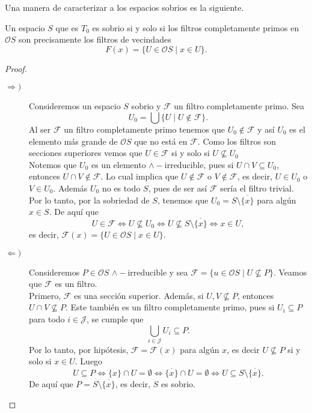 Una manera de caracterizar a los espacios sobrios es la siguiente.

\begin{thm}\label{Fprimo}
Un espacio $S$ que es $T_0$ es sobrio si y solo si los filtros completamente primos en $\mathcal{O}S$ son precisamente los filtros de vecindades
\[
F(x)=\{U\in \mathcal{O}S\mid x\in U\}.
\]
\end{thm}

\begin{proof}
\begin{description}
    \item[$\Rightarrow )$] Consideremos un espacio $S$ sobrio y $\mathcal{F}$ un filtro completamente primo. Sea 
    \[
    U_0=\bigcup\{U\mid U\notin \mathcal{F}\}.
    \]
    Al ser $\mathcal{F}$ un filtro completamente primo tenemos que $U_0\notin \mathcal{F}$ y así $U_0$ es el elemento más grande de $\mathcal{O}S$ que no está en $\mathcal{F}$. Como los filtros son secciones superiores vemos que $U\in \mathcal{F}$ si y solo si $U\nsubseteq U_0$\\

    \noindent
    Notemos que $U_0$ es un elemento $\wedge-$irreducible, pues si $U\cap V\subseteq U_0$, entonces $U\cap V\notin \mathcal{F}$. Lo cual implica que $U\notin\mathcal{F}$ o $V\notin\mathcal{F}$, es decir, $U\in U_0$ o $V\in U_0$. Además $U_0$ no es todo $S$, pues de ser así $\mathcal{F}$ sería el filtro trivial.\\

    \noindent
    Por lo tanto, por la sobriedad de $S$, tenemos que $U_0=S\setminus \overline{\{x\}}$ para algún $x\in S$. De aquí que 
    \[
    U\in \mathcal{F}\Leftrightarrow U\nsubseteq U_0\Leftrightarrow U\nsubseteq S\setminus \overline{\{x\}}\Leftrightarrow x\in U,
    \]
    es decir, $\mathcal{F}(x)=\{U\in\mathcal{O}S\mid x\in U\}$.
    \item[$\Leftarrow )$]  Consideremos $P\in\mathcal{O}S$ $\wedge-$irreducible y sea $\mathcal{F}=\{u\in \mathcal{O}S\mid U\nsubseteq P\}$. Veamos que $\mathcal{F}$ es un filtro.\\
    
    Primero, $\mathcal{F}$ es una sección superior. Además, si $U, V\nsubseteq P$, entonces $U\cap V\nsubseteq P$. Este también es un filtro completamente primo, pues si $U_i\subseteq P$ para todo $i\in \mathcal{J}$, se cumple que 
    \[
    \bigcup_{i\in\mathcal{J}}U_i\subseteq P.
    \]
    Por lo tanto, por hipótesis, $\mathcal{F}=\mathcal{F}(x)$ para algún $x$, es decir $U\nsubseteq P$ si y solo si $x\in U$. Luego
    \[
    U\subseteq P\Leftrightarrow \{x\}\cap U=\emptyset\Leftrightarrow \overline{\{x\}}\cap U=\emptyset\Leftrightarrow U\subseteq S\setminus \overline{\{x\}}.
    \]
    De aquí que $P=S\setminus \overline{\{x\}}$, es decir, $S$ es sobrio.
\end{description}    
\end{proof}

